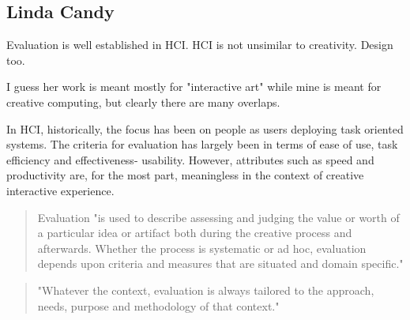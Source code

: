 \subsection{Linda Candy}

Evaluation is well established in HCI. HCI is not unsimilar to creativity. Design too.

I guess her work is meant mostly for "interactive art" while mine is meant for creative computing, but clearly there are many overlaps.

In HCI, historically, the focus has been on people as users deploying task oriented systems. The criteria for evaluation has largely been in terms of ease of use, task efficiency and effectiveness- usability. However, attributes such as speed and productivity are, for the most part, meaningless in the context of creative interactive experience. \citep[p.23]{Candy2012}

\begin{quote}
  Evaluation "is used to describe assessing and judging the value or worth of a particular idea or artifact both during the creative process and afterwards. Whether the process is systematic or ad hoc, evaluation depends upon criteria and measures that are situated and domain specific." \citep[p.7]{Candy2012}
\end{quote}

\begin{quote}
  "Whatever the context, evaluation is always tailored to the approach, needs, purpose and methodology of that context." \citep[p.7]{Candy2012}
\end{quote}


